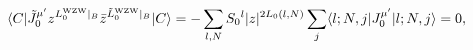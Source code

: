 \begin{equation}
 \langle C | {\tilde J}_0^{\mu'} z^{L_0^{\rm WZW}\vert_B}
             {\bar z}^{{\tilde L}_0^{\rm WZW}\vert_B}
 | C \rangle
 = - \sum_{l,N} S_0{}^l |z|^{2 L_0(l,N)}
     \sum_j \langle l;N,j| J_0^{\mu'} |l;N,j \rangle = 0,
\end{equation}

